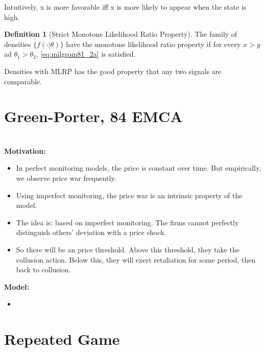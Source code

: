 \documentclass{book}
\theoremstyle{plain}
\theoremstyle{definition}
\newtheorem{defn}{Definition}[section] %
\begin{document}
Intuitively, x is more favorable iff x is more likely to appear when the state is high.

\begin{defn}[Strict Monotone Likelihood Ratio Property]
The family of densities $\{f(\cdot|\theta)\}$ have the monotone likelihood ratio property if for every $x>y$ ad $\theta_1>\theta_2$, \eqref{eq:milgrom81_2a} is satisfied.
\end{defn}

Densities with MLRP has the good property that any two signals are comparable.







\section{Green-Porter, 84 EMCA} %
\label{sec:green_porter_84_emca}

\textbf{}\\

\noindent
\textbf{Motivation:}
\begin{itemize}
	\setlength{\itemsep}{0pt}
	\item In perfect monitoring models, the price is constant over time. But empirically, we observe price war frequently.
	\item Using imperfect monitoring, the price war is an intrinsic property of the model.
	\item The idea is: based on imperfect monitoring. The firms cannot perfectly distinguish others' deviation with a price shock.
	\item So there will be an  price threshold. Above this threshold, they take the collusion action. Below this, they will exert retaliation for some period, then back to collusion.
\end{itemize}

\noindent
\textbf{Model:}
\begin{itemize}
	\item 
\end{itemize}




\section{Repeated Game} %
\label{sec:repeated_game}
\end{document}

